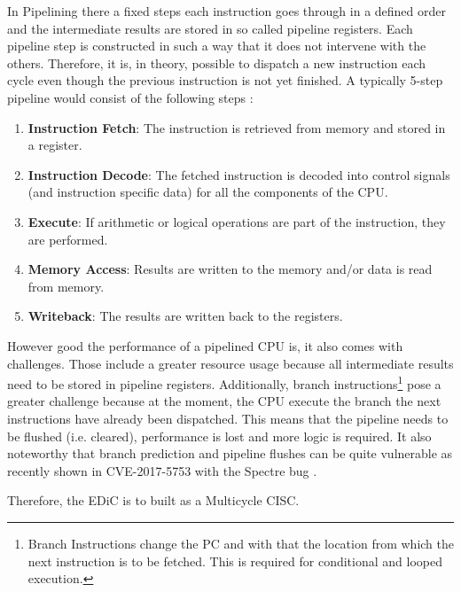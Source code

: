 In Pipelining there a fixed steps each instruction goes through in a defined order and the intermediate results are stored in so called pipeline registers.
Each pipeline step is constructed in such a way that it does not intervene with the others.
Therefore, it is, in theory, possible to dispatch a new instruction each cycle even though the previous instruction is not yet finished.
A typically 5-step pipeline would consist of the following steps \cite{PattersonDavid2016RuRD}:
\begin{enumerate}
  \item \textbf{Instruction Fetch}: The instruction is retrieved from memory and stored in a register.
  \item \textbf{Instruction Decode}: The fetched instruction is decoded into control signals (and instruction specific data) for all the components of the \gls{CPU}.
  \item \textbf{Execute}: If arithmetic or logical operations are part of the instruction, they are performed.
  \item \textbf{Memory Access}: Results are written to the memory and/or data is read from memory.
  \item \textbf{Writeback}: The results are written back to the registers.
\end{enumerate}
However good the performance of a pipelined \gls{CPU} is, it also comes with challenges.
Those include a greater resource usage because all intermediate results need to be stored in pipeline registers.
Additionally, branch instructions\footnote{Branch Instructions change the \gls{PC} and with that the location from which the next instruction is to be fetched. This is required for conditional and looped execution.} pose a greater challenge because at the moment, the \gls{CPU} execute the branch the next instructions have already been dispatched.
This means that the pipeline needs to be flushed (i.e. cleared), performance is lost and more logic is required.
It also noteworthy that branch prediction and pipeline flushes can be quite vulnerable as recently shown in CVE-2017-5753 with the Spectre bug \cite{CVE-2017-5753}.

Therefore, the \gls{EDiC} is to built as a Multicycle \gls{CISC}.

